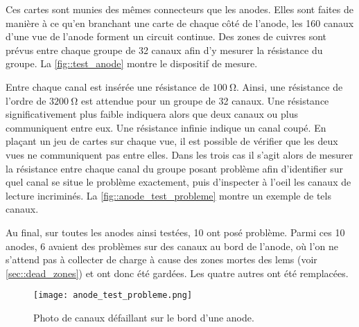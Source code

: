       Ces cartes sont munies des mêmes connecteurs que les anodes. Elles sont faites de manière à ce qu'en branchant une carte de chaque côté de l'anode, les 160 canaux d'une vue de l'anode forment un circuit continue. Des zones de cuivres sont prévus entre chaque groupe de 32 canaux afin d'y mesurer la résistance du groupe. La \autoref{fig::test_anode} montre le dispositif de mesure.

      Entre chaque canal est insérée une résistance de $\SI{100}{\ohm}$. Ainsi, une résistance de l'ordre de $\SI{3200}{\ohm}$ est attendue pour un groupe de 32 canaux. Une résistance significativement plus faible indiquera alors que deux canaux ou plus communiquent entre eux. Une résistance infinie indique un canal coupé. En plaçant un jeu de cartes sur chaque vue, il est possible de vérifier que les deux vues ne communiquent pas entre elles. Dans les trois cas il s'agit alors de mesurer la résistance entre chaque canal du groupe posant problème afin d'identifier sur quel canal se situe le problème exactement, puis d'inspecter à l'oeil les canaux de lecture incriminés. La \autoref{fig::anode_test_probleme} montre un exemple de tels canaux.

      Au final, sur toutes les anodes ainsi testées, 10 ont posé problème. Parmi ces 10 anodes, 6 avaient des problèmes sur des canaux au bord de l'anode, où l'on ne s'attend pas à collecter de charge à cause des zones mortes des \glspl{lem} (voir \autoref{sec::dead_zones}) et ont donc été gardées. Les quatre autres ont été remplacées.

      \begin{figure}
        \centering
        \texttt{[image: anode\_test\_probleme.png]}
        \caption[Photo de canaux défaillant sur le bord d'une anode]{\label{fig::anode_test_probleme}Photo de canaux défaillant sur le bord d'une anode.}
      \end{figure}

